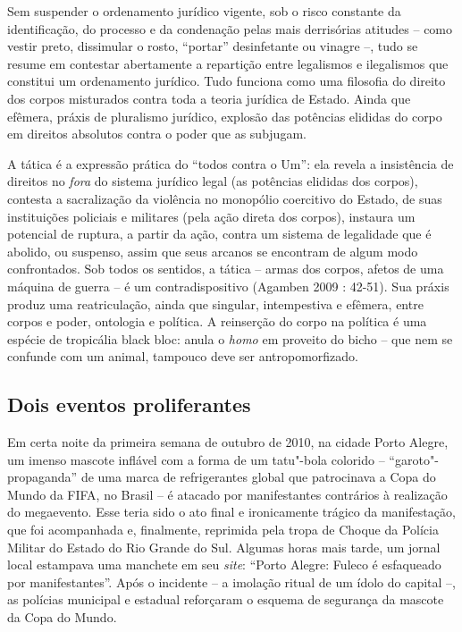 Sem suspender o ordenamento jurídico vigente, sob o risco constante da
identificação, do processo e da condenação pelas mais derrisórias
atitudes -- como vestir preto, dissimular o rosto, ``portar''
desinfetante ou vinagre --, tudo se resume em contestar abertamente a
repartição entre legalismos e ilegalismos que constitui um ordenamento
jurídico. Tudo funciona como uma filosofia do direito dos corpos
misturados contra toda a teoria jurídica de Estado. Ainda que efêmera,
práxis de pluralismo jurídico, explosão das potências elididas do corpo
em direitos absolutos contra o poder que as subjugam.

A tática é a expressão prática do ``todos contra o Um'': ela revela a
insistência de direitos no \emph{fora} do sistema jurídico legal (as
potências elididas dos corpos), contesta a sacralização da violência no
monopólio coercitivo do Estado, de suas instituições policiais e
militares (pela ação direta dos corpos), instaura um potencial de
ruptura, a partir da ação, contra um sistema de legalidade que é
abolido, ou suspenso, assim que seus arcanos se encontram de algum modo
confrontados. Sob todos os sentidos, a tática -- armas dos corpos,
afetos de uma máquina de guerra -- é um contradispositivo (Agamben 2009
: 42-51). Sua práxis produz uma reatriculação, ainda que singular,
intempestiva e efêmera, entre corpos e poder, ontologia e política. A
reinserção do corpo na política é uma espécie de tropicália black bloc:
anula o \emph{homo} em proveito do bicho -- que nem se confunde com um
animal, tampouco deve ser antropomorfizado.

\subsection{Dois eventos proliferantes}

Em certa noite da primeira semana
de outubro de 2010, na cidade Porto Alegre, um imenso mascote inflável
com a forma de um tatu"-bola colorido -- ``garoto"-propaganda'' de uma
marca de refrigerantes global que patrocinava a Copa do Mundo da FIFA,
no Brasil -- é atacado por manifestantes contrários à realização do
megaevento. Esse teria sido o ato final e ironicamente trágico da
manifestação, que foi acompanhada e, finalmente, reprimida pela tropa de
Choque da Polícia Militar do Estado do Rio Grande do Sul. Algumas horas
mais tarde, um jornal local estampava uma manchete em seu \emph{site}:
``Porto Alegre: Fuleco é esfaqueado por manifestantes''. Após o
incidente -- a imolação ritual de um ídolo do capital --, as polícias
municipal e estadual reforçaram o esquema de segurança da mascote da
Copa do Mundo.

